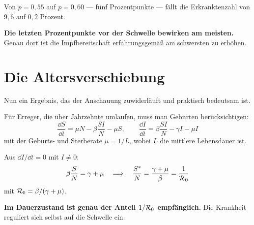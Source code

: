\begin{merksatz}
\begin{center}
\begin{minipage}{0.88\textwidth}
\end{minipage}
\end{center}

Von $p = 0{,}55$ auf $p = 0{,}60$ --- fünf Prozentpunkte --- fällt die Erkranktenzahl von $9{,}6$ auf $0{,}2$ Prozent.

\begin{center}
\begin{minipage}{0.9\textwidth}
\textbf{Die letzten Prozentpunkte vor der Schwelle bewirken am meisten.} Genau dort ist die Impfbereitschaft erfahrungsgemäß am schwersten zu erhöhen.
\end{minipage}
\end{center}
\end{merksatz}

\section{Die Altersverschiebung}

Nun ein Ergebnis, das der Anschauung zuwiderläuft und praktisch bedeutsam ist.

\begin{merksatz}
Für Erreger, die über Jahrzehnte umlaufen, muss man Geburten berücksichtigen:
\[ \frac{\dd S}{\dd t} = \mu N - \beta\frac{SI}{N} - \mu S, \qquad
\frac{\dd I}{\dd t} = \beta\frac{SI}{N} - \gamma I - \mu I \]
mit der Geburts- und Sterberate $\mu = 1/L$, wobei $L$ die mittlere Lebensdauer ist.

Aus $\dd I/\dd t = 0$ mit $I \neq 0$:
\[ \beta\frac{S}{N} = \gamma + \mu \quad\Longrightarrow\quad \frac{S^{*}}{N} = \frac{\gamma+\mu}{\beta} = \frac{1}{\mathcal{R}_0} \]
mit $\mathcal{R}_0 = \beta/(\gamma+\mu)$.

\begin{center}
\begin{minipage}{0.9\textwidth}
\textbf{Im Dauerzustand ist genau der Anteil $1/\mathcal{R}_0$ empfänglich.} Die Krankheit reguliert sich selbst auf die Schwelle ein.
\end{minipage}
\end{center}

\begin{center}
\begin{minipage}{0.88\textwidth}
\end{minipage}
\end{center}
\end{merksatz}

